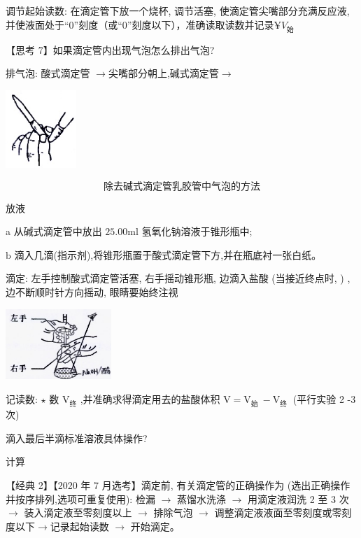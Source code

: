 \documentclass[10pt,cn]{elegantbook}
\begin{document}
	
	调节起始读数: 在滴定管下放一个烧杯, 调节活塞, 使滴定管尖嘴部分充满反应液, 并使液面处于“0”刻度（或“0”刻度以下），准确读取读数并记录$¥V_{\mbox{始}}$
	
	【思考 7】如果滴定管内出现气泡怎么排出气泡? 
	
	排气泡: 酸式滴定管 \(\rightarrow\)尖嘴部分朝上,碱式滴定管\(\rightarrow\)
	
	\begin{center}
		\includegraphics[max width=0.2\textwidth]{image/c4-1.jpg}
	\end{center}
		\[\mbox{除去碱式滴定管乳胶管中气泡的方法}\]
	
	
	 放液
	
	a 从碱式滴定管中放出 \({25.00}\mathrm{{ml}}\) 氢氧化钠溶液于锥形瓶中;
	
	
	
	\(\mathrm{b}\) 滴入几滴(指示剂),将锥形瓶置于酸式滴定管下方,并在瓶底衬一张白纸。
	
		滴定: 左手控制酸式滴定管活塞, 右手摇动锥形瓶, 边滴入盐酸 (当接近终点时, ) , 边不断顺时针方向摇动, 眼睛要始终注视
	
	\begin{center}
		\includegraphics[max width=0.3\textwidth]{image/c4-2.jpg}
	\end{center}
	
	记读数: $\star$ 数 \({\mathrm{V}}_{\text{终}}\) ,并准确求得滴定用去的盐酸体积 \(\mathrm{V} = {\mathrm{V}}_{\text{始 }} - {\mathrm{V}}_{\text{终 }}\) (平行实验 2 -3 次) 
	
	滴入最后半滴标准溶液具体操作?
	
	计算
	
	【经典 2】【2020 年 7 月选考】滴定前, 有关滴定管的正确操作为 (选出正确操作并按序排列,选项可重复使用): 检漏 \(\rightarrow\) 蒸馏水洗涤 \(\rightarrow\) 用滴定液润洗 2 至 3 次 \(\rightarrow\) 装入滴定液至零刻度以上 \(\rightarrow\) 排除气泡 \(\rightarrow\) 调整滴定液液面至零刻度或零刻度以下\( \rightarrow \)记录起始读数 \(\rightarrow\) 开始滴定。
	
\end{document}
